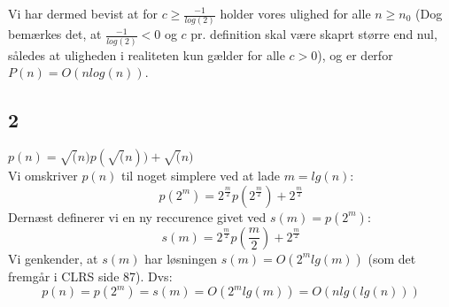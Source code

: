 Vi har dermed bevist at for $c \geq \frac{-1}{log(2)}$ holder vores ulighed for alle $n \geq n_0$ (Dog bemærkes det, at $\frac{-1}{log(2)} < 0$ og $c$ pr. definition skal være skaprt større end nul, således at uligheden i realiteten kun gælder for alle $c > 0$), og er derfor $P(n) = O(nlog(n))$.

\subsection{2}

$p(n) = \sqrt(n)p(\sqrt(n)) + \sqrt(n)$\\
Vi omskriver $p(n)$ til noget simplere ved at lade $m = lg(n)$:
$$p(2^m) = 2^{\frac{m}{2}}p(2^{\frac{m}{2}}) + 2^{\frac{m}{2}}$$
Dernæst definerer vi en ny reccurence givet ved $s(m) = p(2^m)$:
$$s(m) = 2^{\frac{m}{2}}p(\frac{m}{2}) + 2^{\frac{m}{2}}$$
Vi genkender, at $s(m)$ har løsningen $s(m) = O(2^mlg(m))$ (som det fremgår i CLRS side 87).
Dvs:
$$p(n) = p(2^m) = s(m) = O(2^mlg(m)) = O(nlg(lg(n)))$$
